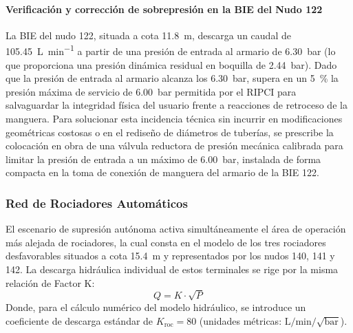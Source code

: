 \documentclass[12pt,a4paper]{article}
\begin{document}
\paragraph{Verificación y corrección de sobrepresión en la BIE del Nudo 122}
La BIE del nudo 122, situada a cota \SI{11.8}{\meter}, descarga un caudal de \SI{105.45}{\liter\per\minute} a partir de una presión de entrada al armario de \SI{6.30}{\bar} (lo que proporciona una presión dinámica residual en boquilla de \SI{2.44}{\bar}). Dado que la presión de entrada al armario alcanza los \SI{6.30}{\bar}, supera en un \SI{5}{\percent} la presión máxima de servicio de \SI{6.00}{\bar} permitida por el RIPCI para salvaguardar la integridad física del usuario frente a reacciones de retroceso de la manguera. Para solucionar esta incidencia técnica sin incurrir en modificaciones geométricas costosas o en el rediseño de diámetros de tuberías, se prescribe la colocación en obra de una válvula reductora de presión mecánica calibrada para limitar la presión de entrada a un máximo de \SI{6.00}{\bar}, instalada de forma compacta en la toma de conexión de manguera del armario de la BIE 122.

\subsubsection{Red de Rociadores Automáticos}

El escenario de supresión autónoma activa simultáneamente el área de operación más alejada de rociadores, la cual consta en el modelo de los tres rociadores desfavorables situados a cota \SI{15.4}{\meter} y representados por los nudos 140, 141 y 142. La descarga hidráulica individual de estos terminales se rige por la misma relación de Factor K:
\begin{equation}
Q = K \cdot \sqrt{P}
\label{eq:factor_k_rociador}
\end{equation}
Donde, para el cálculo numérico del modelo hidráulico, se introduce un coeficiente de descarga estándar de $K_{\text{roc}} = 80$ (unidades métricas: $\text{L/min}/\sqrt{\text{bar}}$).
\end{document}
